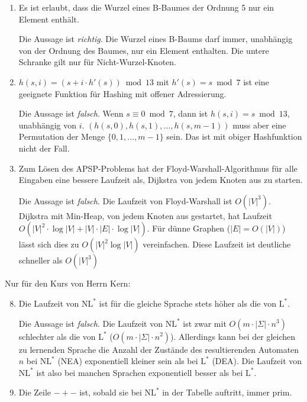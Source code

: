 \documentclass[11pt,a4paper]{article}
\begin{document}
\begin{loesung}
\begin{enumerate}
        \item Es ist erlaubt, dass die Wurzel eines B-Baumes der Ordnung 5 nur ein Element enthält.

        Die Aussage ist \emph{richtig}.
        Die Wurzel eines B-Baums darf immer, unabhängig von der Ordnung des Baumes, nur ein Element enthalten.
        Die untere Schranke gilt nur für Nicht-Wurzel-Knoten.
        \item $h(s, i) = (s + i \cdot h'(s)) \bmod 13$ mit $h'(s) = s \bmod 7$ ist eine geeignete Funktion für Hashing mit offener Adressierung.

        Die Aussage ist \emph{falsch}.
        Wenn $s \equiv 0 \bmod 7$, dann ist $h(s, i) = s \bmod 13$, unabhängig von $i$.
        \newline
        $(h(s, 0), h(s, 1), \ldots, h(s, m-1))$ muss aber eine Permutation der Menge $\{0, 1, \ldots, m-1\}$ sein.
        Das ist mit obiger Hashfunktion nicht der Fall.
        \item Zum Lösen des APSP-Problems hat der Floyd-Warshall-Algorithmus für alle Eingaben eine bessere Laufzeit als, Dijkstra von jedem Knoten aus zu starten.

        Die Aussage ist \emph{falsch}.
        Die Laufzeit von Floyd-Warshall ist $O(|V|^3)$.
        Dijkstra mit Min-Heap, von jedem Knoten aus gestartet, hat Laufzeit $O(|V|^2 \cdot \log |V| + |V|\cdot|E| \cdot\log |V|)$.
        Für dünne Graphen ($|E| = O(|V|)$) lässt sich dies zu $O(|V|^2 \log |V|)$ vereinfachen.
        Diese Laufzeit ist deutliche schneller als $O(|V|^3)$
    \end{enumerate}
    Nur für den Kurs von Herrn Kern:
    \begin{enumerate}
        \setcounter{enumi}{7}
        \item Die Laufzeit von $\mathrm{NL}^*$ ist für die gleiche Sprache stets höher als die von $\mathrm{L}^*$.

        Die Aussage ist \emph{falsch}.
        Die Laufzeit von $\mathrm{NL}^*$ ist zwar mit $O(m \cdot|\Sigma| \cdot n^3)$ schlechter als die von $\mathrm{L}^*$ ($O(m \cdot|\Sigma| \cdot n^2)$).
        Allerdings kann bei der gleichen zu lernenden Sprache die Anzahl der Zustände des resultierenden Automaten $n$ bei $\mathrm{NL}^*$ (NEA) exponentiell kleiner sein als bei $\mathrm{L}^*$ (DEA).
        Die Laufzeit von $\mathrm{NL}^*$ ist also bei manchen Sprachen exponentiell besser als bei $\mathrm{L}^*$.
        \item Die Zeile $-+-$ ist, sobald sie bei $\mathrm{NL}^*$ in der Tabelle auftritt, immer prim.


\end{enumerate}
\end{loesung}
\end{document}
